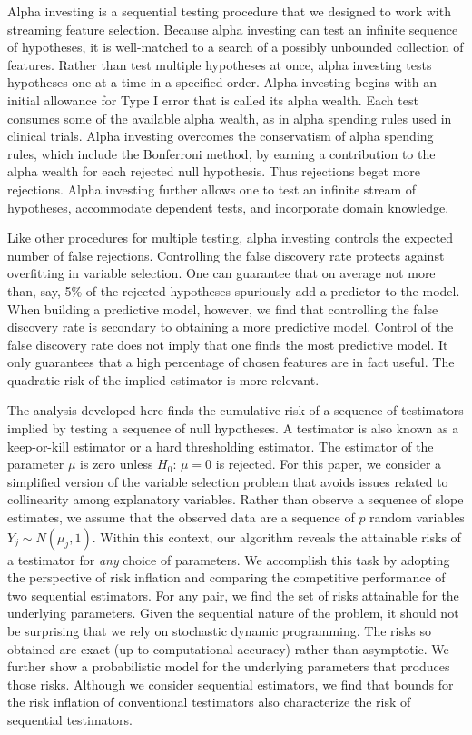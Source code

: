 \documentclass[12pt]{article}
\begin{document}
 Alpha investing \citep{fosterstine08} is a sequential testing procedure that we
 designed to work with streaming feature selection.  Because alpha investing can
 test an infinite sequence of hypotheses, it is well-matched to a search of a
 possibly unbounded collection of features.  Rather than test multiple hypotheses at once, alpha investing
 tests hypotheses one-at-a-time in a specified order.  Alpha investing begins
 with an initial allowance for Type I error that is called its alpha wealth.
  Each test consumes some of the available alpha wealth, as in alpha spending
 rules used in clinical trials.  Alpha investing overcomes the conservatism of
 alpha spending rules, which include the Bonferroni method, by earning a
 contribution to the alpha wealth for each rejected null hypothesis.  Thus
 rejections beget more rejections.  Alpha investing further allows one to test
 an infinite stream of hypotheses, accommodate dependent tests, and incorporate
 domain knowledge.
 

 Like other procedures for multiple testing, alpha investing controls the
 expected number of false rejections.  Controlling the false discovery rate
 protects against overfitting in variable selection.  One can guarantee that on
 average not more than, say, 5\% of the rejected hypotheses spuriously add a
 predictor to the model.  When building a predictive model, however, we find
 that controlling the false discovery rate is secondary to obtaining a more
 predictive model.  Control of the false discovery rate does not imply that one
 finds the most predictive model.  It only guarantees that a high
 percentage of chosen features are in fact useful.  The quadratic risk of the
 implied estimator is more relevant.


 The analysis developed here finds the cumulative risk of a sequence of testimators implied by
 testing a sequence of null hypotheses.  A testimator is also known as a
 keep-or-kill estimator or a hard thresholding estimator.  The estimator of the
 parameter $\mu$ is zero unless $H_0: \,\mu = 0$ is rejected.  For
 this paper, we consider a simplified version of the variable selection problem
 that avoids issues related to collinearity among explanatory variables.  Rather
 than observe a sequence of slope estimates, we assume that the observed data
 are a sequence of $p$ random variables $Y_j \sim N(\mu_j,1)$.  Within
 this context, our algorithm reveals the attainable risks of a
 testimator for {\em any} choice of parameters.  We accomplish this task by
 adopting the perspective of risk inflation and comparing the competitive
 performance of two sequential estimators.  For any pair, we find the set of
 risks attainable for the underlying parameters.  Given the
 sequential nature of the problem, it should not be surprising that we rely on
 stochastic dynamic programming.  The risks so obtained are exact (up to
 computational accuracy) rather than asymptotic.  We further show a
 probabilistic model for the underlying parameters that produces those risks.
  Although we consider sequential estimators, we find that bounds for the risk
 inflation of conventional testimators also characterize the risk of sequential testimators.
\end{document}
